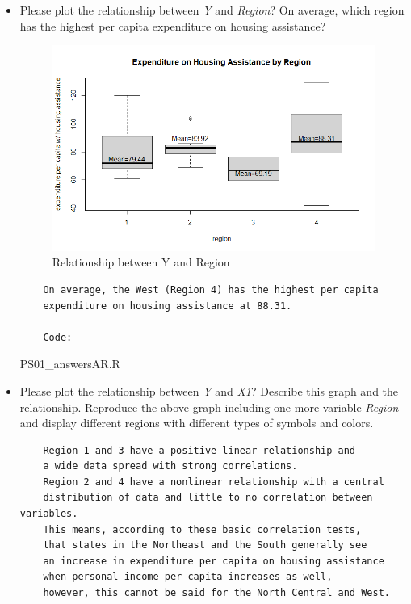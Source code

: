 \documentclass[12pt,letterpaper]{article}
\begin{document}
\begin{itemize}
\begin{Verbatim}
 Code:
\end{Verbatim}
	 {PS01_answersAR.R}
\vspace{3cm}
\item
Please plot the relationship between \emph{Y} and \emph{Region}? On average, which region has the highest per capita expenditure on housing assistance?
\begin{figure}[h!]\centering
	\caption{\footnotesize Relationship between Y and Region}
	\label{fig:plot_2}
	\includegraphics[width=.85\textwidth]{boxplot_yandregion.png}
\end{figure}
\begin{Verbatim}
	On average, the West (Region 4) has the highest per capita 
	expenditure on housing assistance at 88.31.
	
	Code:
\end{Verbatim}
	 {PS01_answersAR.R}
\vspace{5cm}

\item
Please plot the relationship between \emph{Y} and \emph{X1}? Describe this graph and the relationship. Reproduce the above graph including one more variable \emph{Region} and display different regions with different types of symbols and colors.
 \begin{Verbatim}
	Region 1 and 3 have a positive linear relationship and
	a wide data spread with strong correlations.
	Region 2 and 4 have a nonlinear relationship with a central 
	distribution of data and little to no correlation between variables.
	This means, according to these basic correlation tests,
	that states in the Northeast and the South generally see
	an increase in expenditure per capita on housing assistance 
	when personal income per capita increases as well, 
	however, this cannot be said for the North Central and West.
	

\end{Verbatim}
\end{itemize}
\end{document}
